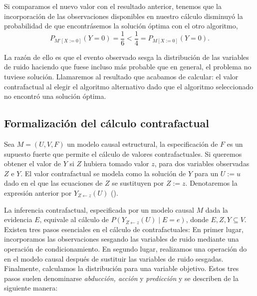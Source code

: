 \documentclass[oneside,openright,titlepage,numbers=noenddot,openany,headinclude,footinclude=true,
cleardoublepage=empty,abstractoff,BCOR=5mm,paper=a4,fontsize=12pt,main=spanish]{scrreprt}
\begin{document}
Si comparamos el nuevo valor con el resultado anterior, tenemos que la incorporación de las observaciones disponibles en nuestro cálculo disminuyó la probabilidad de que encontrásemos la solución óptima con el otro algoritmo,
\begin{equation*}
    P_{M'[X:=0]}(Y = 0)=\frac{1}{6} < \frac{1}{4}=P_{M[X:=0]}(Y = 0).
\end{equation*}

La razón de ello es que el evento observado sesga la distribución de las variables de ruido haciendo que fuese incluso más probable que en general, el problema no tuviese solución. Llamaremos al resultado que acabamos de calcular: el valor contrafactual al elegir el algoritmo alternativo dado que el algoritmo seleccionado no encontró una solución óptima.


\subsection{Formalización del cálculo contrafactual}

Sea $M=(U,V,F)$ un modelo causal estructural, la especificación de $F$ es un supuesto fuerte que permite el cálculo de valores contrafactuales. Si queremos obtener el valor de $Y$ si $Z$ hubiera tomado valor $z$, para dos variables observadas $Z$ e $Y$. El valor contrafactual se modela como la solución de $Y$ para un $U := u$ dado en el que las ecuaciones de $Z$ se sustituyen por $Z := z$. Denotaremos la expresión anterior por $Y_{Z\leftarrow z}(U)$ (\cite{causality2000}).

La inferencia contrafactual, especificada por un modelo causal $M$ dada la evidencia $E$, equivale al cálculo de $P(Y_{Z\leftarrow z}(U) \mid E = e)$, donde $E, Z, Y \subseteq V$. Existen tres pasos esenciales en el cálculo de contrafactuales: En primer lugar, incorporamos las observaciones sesgando las variables de ruido mediante una operación de condicionamiento. En segundo lugar, realizamos una operación do en el modelo causal después de sustituir las variables de ruido sesgadas. Finalmente, calculamos la distribución para una variable objetivo. Estos tres pasos suelen denominarse \textit{abducción, acción} y \textit{predicción} y se describen de la siguiente manera:\\
\end{document}
